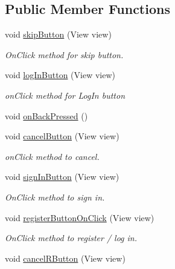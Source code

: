 \subsection*{Public Member Functions}
\begin{DoxyCompactItemize}
\item 
void \hyperlink{classuk_1_1ac_1_1swan_1_1digitaltrails_1_1activities_1_1_launch_activity_a6d79859c68f2c1db35d659c9198ea1ae}{skip\+Button} (View view)
\begin{DoxyCompactList}\small\item\em On\+Click method for skip button. \end{DoxyCompactList}\item 
void \hyperlink{classuk_1_1ac_1_1swan_1_1digitaltrails_1_1activities_1_1_launch_activity_a1f27dc81c450f289f5fd6a939fd69d7b}{log\+In\+Button} (View view)
\begin{DoxyCompactList}\small\item\em on\+Click method for Log\+In button \end{DoxyCompactList}\item 
void \hyperlink{classuk_1_1ac_1_1swan_1_1digitaltrails_1_1activities_1_1_launch_activity_ad3c5c2eec03711a8d59567e708064ea9}{on\+Back\+Pressed} ()
\item 
void \hyperlink{classuk_1_1ac_1_1swan_1_1digitaltrails_1_1activities_1_1_launch_activity_a10e20eef1550ea5c8ffa370fdd920ea4}{cancel\+Button} (View view)
\begin{DoxyCompactList}\small\item\em on\+Click method to cancel. \end{DoxyCompactList}\item 
void \hyperlink{classuk_1_1ac_1_1swan_1_1digitaltrails_1_1activities_1_1_launch_activity_af53e2ce9b4e7d85a5cfa6ad40338b251}{sign\+In\+Button} (View view)
\begin{DoxyCompactList}\small\item\em On\+Click method to sign in. \end{DoxyCompactList}\item 
void \hyperlink{classuk_1_1ac_1_1swan_1_1digitaltrails_1_1activities_1_1_launch_activity_a2f01df12f126e5abe0461d204e647034}{register\+Button\+On\+Click} (View view)
\begin{DoxyCompactList}\small\item\em On\+Click method to register / log in. \end{DoxyCompactList}\item 
void \hyperlink{classuk_1_1ac_1_1swan_1_1digitaltrails_1_1activities_1_1_launch_activity_adab4e7f0527bef7828c4128c9cde914e}{cancel\+R\+Button} (View view)

\end{DoxyCompactItemize}
